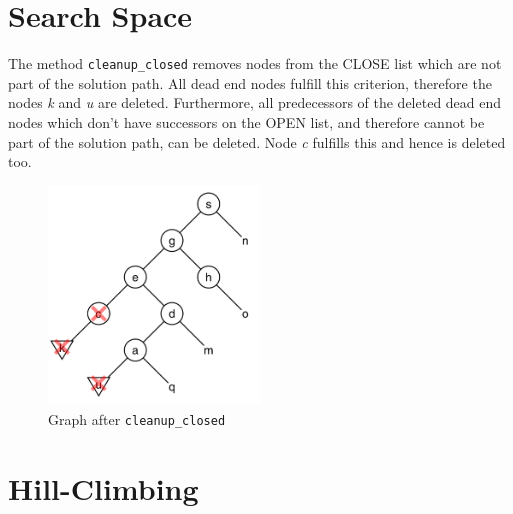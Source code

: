 \documentclass[11pt]{article}
\begin{document}
\section{Search Space}
The method \texttt{cleanup\_closed} removes nodes from the CLOSE list which are not part of the solution path. All dead end nodes fulfill this criterion, therefore the nodes \emph{k} and \emph{u} are deleted. Furthermore, all predecessors of the deleted dead end nodes which don't have successors on the OPEN list, and therefore cannot be part of the solution path, can be deleted. Node \emph{c} fulfills this and hence is deleted too.


\begin{figure}[ht]
	\centering
  \includegraphics[width=0.5\textwidth]{./graph_7.png}
  \caption{Graph after \texttt{cleanup\_closed}}
	\label{fig2}
\end{figure}

\setcounter{section}{6}
\section{Hill-Climbing}
\end{document}
